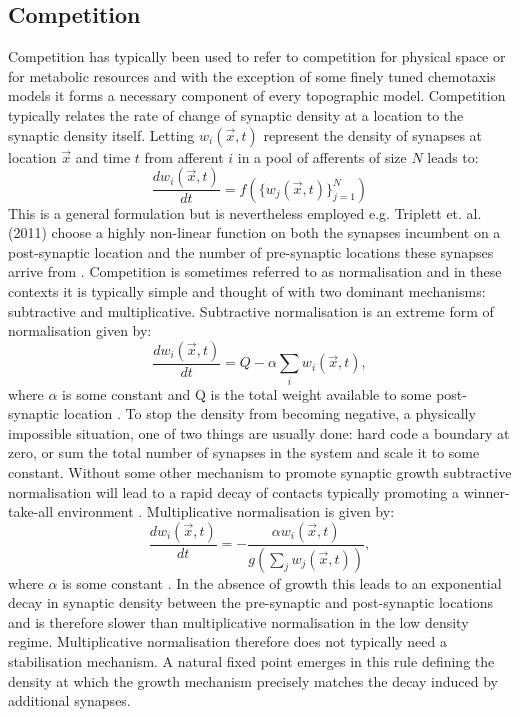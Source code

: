 \subsection{Competition}
Competition has typically been used to refer to competition for physical space or for metabolic resources and with the exception of some finely tuned chemotaxis models it forms a necessary component of every topographic model. Competition typically relates the rate of change of synaptic density at a location to the synaptic density itself. Letting $w_i(\vec{x}, t)$ represent the density of synapses at location $\vec{x}$ and time $t$ from afferent $i$ in a pool of afferents of size $N$ leads to:
\begin{equation}
\frac{dw_i (\vec{x}, t)}{dt} = f\left(\{w_j (\vec{x}, t) \}_{j=1}^N\right)
\end{equation} 
This is a general formulation but is nevertheless employed e.g. Triplett et. al. (2011) choose a highly non-linear function on both the synapses incumbent on a post-synaptic location and the number of pre-synaptic locations these synapses arrive from \cite{Triplett2011-jk}. Competition is sometimes referred to as normalisation and in these contexts it is typically simple and thought of with two dominant mechanisms: subtractive and multiplicative. Subtractive normalisation is an extreme form of normalisation given by:
\begin{equation}
\frac{dw_i(\vec{x}, t)}{dt} = Q-\alpha \sum_i w_i (\vec{x}, t),
\end{equation} 
where $\alpha$ is some constant and Q is the total weight available to some post-synaptic location \cite{Goodhill1991-fu, Goodhill1993-lk}. To stop the density from becoming negative, a physically impossible situation, one of two things are usually done: hard code a boundary at zero, or sum the total number of synapses in the system and scale it to some constant. Without some other mechanism to promote synaptic growth subtractive normalisation will lead to a rapid decay of contacts typically promoting a winner-take-all environment \cite{Miller1994-nr}. Multiplicative normalisation is given by:
\begin{equation}
\frac{dw_i(\vec{x}, t)}{dt} = -\frac{\alpha w_i(\vec{x}, t)}{g\left(\sum_j w_j(\vec{x}, t)\right)},
\end{equation}
where $\alpha$ is some constant \cite{Kohonen1982-nd, Obermayer1990-yr}. In the absence of growth this leads to an exponential decay in synaptic density between the pre-synaptic and post-synaptic locations and is therefore slower than multiplicative normalisation in the low density regime. Multiplicative normalisation therefore does not typically need a stabilisation mechanism. A natural fixed point emerges in this rule defining the density at which the growth mechanism precisely matches the decay induced by additional synapses.

